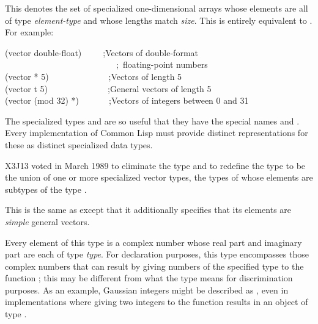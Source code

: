 \begin{flushdesc}
\item[\cd{(vector \emph{element-type} \emph{size})}]
This denotes the set of
specialized one-dimensional arrays whose elements are all of type \emph{
element-type} and whose lengths match \emph{size}.  This is entirely equivalent to
.
For example:
\begin{lisp}
(vector double-float)~~~~~;\textrm{Vectors of double-format} \\
~~~~~~~~~~~~~~~~~~~~~~~~~~;~\textrm{floating-point numbers} \\
(vector * 5)~~~~~~~~~~~~~~;\textrm{Vectors of length 5} \\
(vector t 5)~~~~~~~~~~~~~~;\textrm{General vectors of length 5} \\
(vector (mod 32) *)~~~~~~~;\textrm{Vectors of integers between 0 and 31}
\end{lisp}
\begin{obsolete}
The specialized types  and  are so
useful that they have the special names  and .
Every implementation of Common Lisp must provide distinct representations for
these as distinct specialized data types.
\end{obsolete}

\begin{newer}
X3J13 voted in March 1989 
to eliminate the type  and to redefine the type
 to be the union of one or more specialized vector
types, the types of whose elements are subtypes of the type .
\end{newer}

\item[\cd{(simple-vector \emph{size})}]
This is the same
as  except that it additionally specifies
that its elements are \emph{simple} general vectors.

\item[\cd{(complex \emph{type})}]
Every element of this type is a
complex number whose real part
and imaginary part are each of type \emph{type}.
For declaration purposes, this type encompasses those complex numbers
that can result by giving numbers of the specified type
to the function ; this may be different
from what the type means for discrimination purposes.
As an example, Gaussian integers might be
described as , even in implementations
where giving two integers to the function  results
in an object of type .


\end{flushdesc}

